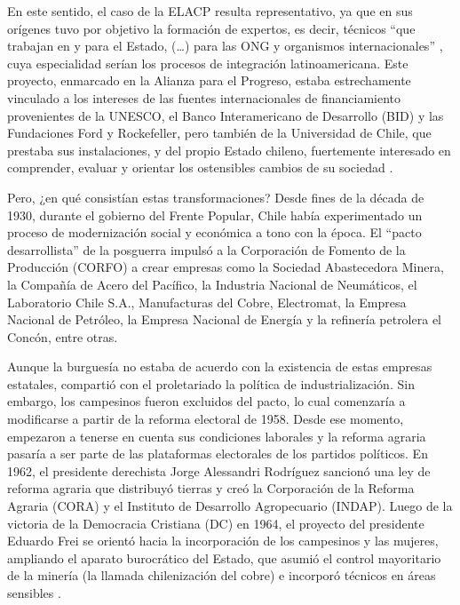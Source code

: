 En este sentido, el caso de la ELACP resulta representativo, ya que en sus orígenes tuvo por objetivo la formación de expertos, es decir, técnicos \enquote{que trabajan en y para el Estado, (\dots) para las ONG y organismos internacionales} \parencite[15]{1549-NEIBURG2004}, cuya especialidad serían los procesos de integración latinoamericana. Este proyecto, enmarcado en la Alianza para el Progreso, estaba estrechamente vinculado a los intereses de las fuentes internacionales de financiamiento provenientes de la UNESCO, el Banco Interamericano de Desarrollo (BID) y las Fundaciones Ford y Rockefeller, pero también de la Universidad de Chile, que prestaba sus instalaciones, y del propio Estado chileno, fuertemente interesado en comprender, evaluar y orientar los ostensibles cambios de su sociedad \parencite{1514-ABARZUACUTRONI2010,1524-BEIGEL2010,1529-QUESADA2010}.

Pero, ¿en qué consistían estas transformaciones? Desde fines de la década de 1930, durante el gobierno del Frente Popular, Chile había experimentado un proceso de modernización social y económica a tono con la época. El \enquote{pacto desarrollista} de la posguerra impulsó a la Corporación de Fomento de la Producción (CORFO) a crear empresas como la Sociedad Abastecedora Minera, la Compañía de Acero del Pacífico, la Industria Nacional de Neumáticos, el Laboratorio Chile S.A., Manufacturas del Cobre, Electromat, la Empresa Nacional de Petróleo, la Empresa Nacional de Energía y la refinería petrolera el Concón, entre otras.

Aunque la burguesía no estaba de acuerdo con la existencia de estas empresas estatales, compartió con el proletariado la política de industrialización. Sin embargo, los campesinos fueron excluidos del pacto, lo cual comenzaría a modificarse a partir de la reforma electoral de 1958. Desde ese momento, empezaron a tenerse en cuenta sus condiciones laborales y la reforma agraria pasaría a ser parte de las plataformas electorales de los partidos políticos. En 1962, el presidente derechista Jorge Alessandri Rodríguez sancionó una ley de reforma agraria que distribuyó tierras y creó la Corporación de la Reforma Agraria (CORA) y el Instituto de Desarrollo Agropecuario (INDAP). Luego de la victoria de la Democracia Cristiana (DC) en 1964, el proyecto del presidente Eduardo Frei se orientó hacia la incorporación de los campesinos y las mujeres, ampliando el aparato burocrático del Estado, que asumió el control mayoritario de la minería (la llamada chilenización del cobre) e incorporó técnicos en áreas sensibles \parencite{1517-ALWIN1986,1614-DERIZ1979,1669-MOLINASILVA1972}.

